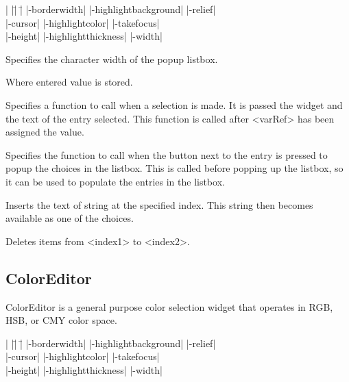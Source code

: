 \begin{tabbing}
|                   |\=|                     |\= \kill
|-borderwidth|      \> |-highlightbackground| \> |-relief| \\
|-cursor|           \> |-highlightcolor|      \> |-takefocus| \\
|-height|	    \> |-highlightthickness|  \> |-width| \\
\end{tabbing}

\vskip5pt

\begin{enum}{1cm}

Specifies the character width of the popup listbox. 

Where entered value is stored. 

Specifies a function to call when a selection is made.
It is passed the widget and the text of the entry
selected. This function is called after <varRef> has been
assigned the value.

Specifies the function to call when the button next to the entry is pressed to popup the
choices in the listbox. This is called before popping up the listbox, so it can be used to
populate the entries in the listbox. 

\end{enum}

\vskip5pt

\begin{enum}{1cm}

Inserts the text of string at the specified index. This string then becomes available as one of the choices. 

Deletes items from <index1> to <index2>. 

\end{enum}

\subsection*{ColorEditor}
ColorEditor is a general purpose color selection widget that operates
in RGB, HSB, or CMY color space.
\vskip5pt
\vspace{-4pt}

\begin{tabbing}
|                   |\=|                     |\= \kill
|-borderwidth| \> |-highlightbackground|     \> |-relief| \\   
|-cursor|      \> |-highlightcolor|          \> |-takefocus| \\
|-height|      \> |-highlightthickness|      \> |-width| \\
\end{tabbing}


